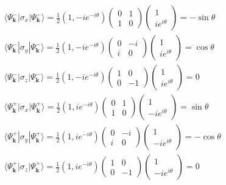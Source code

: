 \documentclass{article}
\begin{document}
\begin{align*}
&\langle\Psi_{\mathbf{k}}^-|\sigma_x|\Psi_{\mathbf{k}}^-\rangle=\frac{1}{2}(1,-ie^{-i\theta})\left(\begin{array}{cc}0&1\\1&0\end{array}\right)\left(\begin{array}{c}1\\ie^{i\theta}\end{array}\right)=-\sin\theta\\
&\langle\Psi_{\mathbf{k}}^-|\sigma_y|\Psi_{\mathbf{k}}^-\rangle=\frac{1}{2}(1,-ie^{-i\theta})\left(\begin{array}{cc}0&-i\\i&0\end{array}\right)\left(\begin{array}{c}1\\ie^{i\theta}\end{array}\right)=\cos\theta\\
&\langle\Psi_{\mathbf{k}}^-|\sigma_z|\Psi_{\mathbf{k}}^-\rangle=\frac{1}{2}(1,-ie^{-i\theta})\left(\begin{array}{cc}1&0\\0&-1\end{array}\right)\left(\begin{array}{c}1\\ie^{i\theta}\end{array}\right)=0\\
&\langle\Psi_{\mathbf{k}}^+|\sigma_x|\Psi_{\mathbf{k}}^+\rangle=\frac{1}{2}(1,ie^{-i\theta})\left(\begin{array}{cc}0&1\\1&0\end{array}\right)\left(\begin{array}{c}1\\-ie^{i\theta}\end{array}\right)=\sin\theta\\
&\langle\Psi_{\mathbf{k}}^+|\sigma_y|\Psi_{\mathbf{k}}^+\rangle=\frac{1}{2}(1,ie^{-i\theta})\left(\begin{array}{cc}0&-i\\i&0\end{array}\right)\left(\begin{array}{c}1\\-ie^{i\theta}\end{array}\right)=-\cos\theta\\
&\langle\Psi_{\mathbf{k}}^+|\sigma_z|\Psi_{\mathbf{k}}^+\rangle=\frac{1}{2}(1,ie^{-i\theta})\left(\begin{array}{cc}1&0\\0&-1\end{array}\right)\left(\begin{array}{c}1\\-ie^{i\theta}\end{array}\right)=0
\end{align*}
\end{document}
